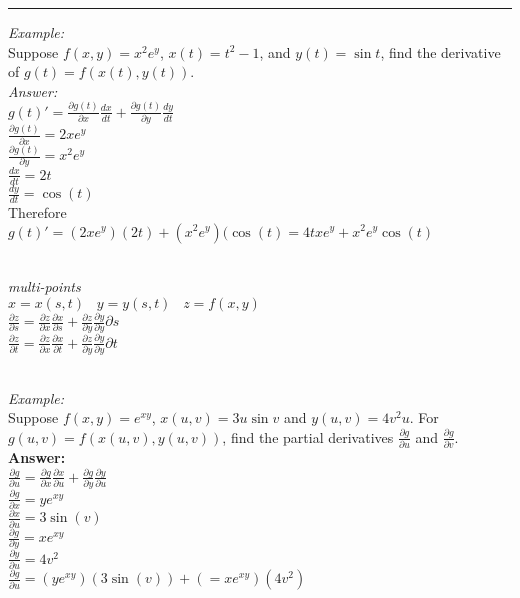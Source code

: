 \documentclass[11pt]{article}
\newenvironment{proof}{{\bf Proof:  }}{\hfill\rule{2mm}{2mm}}
\begin{document}
\begin{enumerate}
\begin{center}
\begin{proof}
\end{proof}


\end{center}


\textit{Example:}
\\
 Suppose $f(x,y) = x^2 e^y$, $x(t) = t^2 - 1$, and $y(t) = \sin t$, find the derivative of $g(t) = f(x(t), y(t))$.
    \\
    \textit{Answer:}
\\
$g(t)'=\frac{\partial g(t)}{\partial x} \frac{dx}{dt} + \frac{\partial g(t)}{\partial y} \frac{dy}{dt}$
\\
$\frac{\partial g(t)}{\partial x}= 2xe^y$
\\
$\frac{\partial g(t)}{\partial y}= x^2e^y$
\\
$\frac{dx}{dt}=2t$
\\
$\frac{dy}{dt}= \cos (t)$
\\
Therefore
\\
$g(t)'=(2xe^y)(2t)+(x^2e^y)(\cos (t)= 4txe^y+x^2e^y \cos (t)$



\\


\textit{multi-points}
\\
$x=x(s,t) \; \; \; y=y(s,t) \; \; \; z=f(x,y)$
\\
$\frac{\partial z}{\partial s}= \frac{\partial z}{\partial x}\frac{\partial x}{\partial s}+ \frac{\partial z}{\partial y} \frac{\partial y}{\partial y}{\partial s}$
\\
$\frac{\partial z}{\partial t}= \frac{\partial z}{\partial x}\frac{\partial x}{\partial t}+ \frac{\partial z}{\partial y} \frac{\partial y}{\partial y}{\partial t}$

\\

\textit{Example:}
\\
Suppose $f(x,y) = e^{xy}$, $x(u,v) = 3u \sin v$ and $y(u,v) = 4v^2u$.  For $g(u,v) = f(x(u,v), y(u,v))$, find the partial derivatives $\frac{\partial g}{\partial u}$ and $\frac{\partial g}{\partial v}$.
    \\
    \textbf{Answer:}
    \\
    $\frac{\partial g}{\partial u}=\frac{\partial g}{\partial x} \frac{\partial x}{\partial u}+ \frac{\partial g}{\partial y} \frac{\partial y}{\partial u}$
    \\
    $\frac{\partial g}{\partial x}=ye^{xy}$
    \\
    $\frac{\partial x}{\partial u}=3 \sin (v)$
    \\
    $\frac{\partial g}{\partial y}=xe^{xy}$
    \\
    $\frac{\partial y}{\partial u}=4v^2$
    \\
    $\frac{\partial g}{\partial u}=(ye^{xy})(3 \sin (v))+(=xe^{xy})(4v^2)$
    

\end{enumerate}
\end{document}
